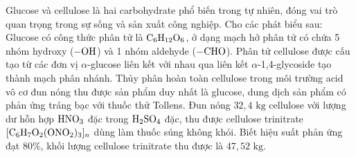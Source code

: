 \documentclass[11pt,a4paper]{article}
\begin{document}
\begin{ex}
Glucose và cellulose là hai carbohydrate phổ biến trong tự nhiên, đóng vai trò quan trọng trong sự sống và sản xuất công nghiệp. Cho các phát biểu sau:
\choiceTF
{\True Glucose có công thức phân tử là $\ce{C6H12O6}$, ở dạng mạch hở phân tử có chứa 5 nhóm hydroxy ($\ce{-OH}$) và 1 nhóm aldehyde ($\ce{-CHO}$).}
{Phân tử cellulose được cấu tạo từ các đơn vị $\alpha$-glucose liên kết với nhau qua liên kết $\alpha$-1,4-glycoside tạo thành mạch phân nhánh.}
{\True Thủy phân hoàn toàn cellulose trong môi trường acid vô cơ đun nóng thu được sản phẩm duy nhất là glucose, dung dịch sản phẩm có phản ứng tráng bạc với thuốc thử Tollens.}
{\True Đun nóng $32{,}4\text{ kg}$ cellulose với lượng dư hỗn hợp $\ce{HNO3}$ đặc trong $\ce{H2SO4}$ đặc, thu được cellulose trinitrate $[\ce{C6H7O2(ONO2)3}]_n$ dùng làm thuốc súng không khói. Biết hiệu suất phản ứng đạt $80\%$, khối lượng cellulose trinitrate thu được là $47{,}52\text{ kg}$.}

\end{ex}
\end{document}

